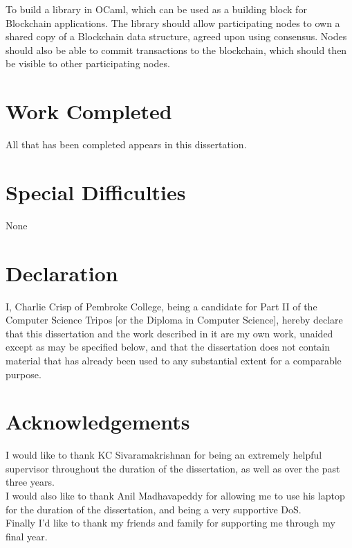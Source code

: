 \documentclass[12pt,a4paper,twoside,openright]{report}
\begin{document}
	To build a library in OCaml, which can be used as a building block for Blockchain applications. 
	The library should allow participating nodes to own a shared copy of a Blockchain data structure, agreed upon using consensus.
	Nodes should also be able to commit transactions to the blockchain, which should then be visible to other participating nodes. 
	
	
	\section*{Work Completed}
	
	All that has been completed appears in this dissertation.
	
	\section*{Special Difficulties}
	
	None
	 
	\newpage
	\section*{Declaration}
	
	I, Charlie Crisp of Pembroke College, being a candidate for Part II of the Computer
	Science Tripos [or the Diploma in Computer Science], hereby declare
	that this dissertation and the work described in it are my own work,
	unaided except as may be specified below, and that the dissertation
	does not contain material that has already been used to any substantial
	extent for a comparable purpose.
	
	\bigskip
	
	\medskip
	
	\tableofcontents
	
	\listoffigures
	
	\newpage
	\section*{Acknowledgements}
	
	I would like to thank KC Sivaramakrishnan for being an extremely helpful supervisor throughout the duration of the dissertation, as well as over the past three years.\\
	I would also like to thank Anil Madhavapeddy for allowing me to use his laptop for the duration of the dissertation, and being a very supportive DoS.\\
	Finally I'd like to thank my friends and family for supporting me through my final year.
	
\end{document}

